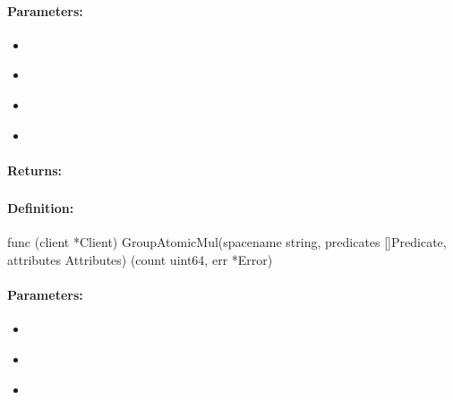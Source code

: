 \paragraph{Parameters:}
\begin{itemize}[noitemsep]
\item {}\\

\item {}\\

\item {}\\

\item {}\\

\end{itemize}

\paragraph{Returns:}


\pagebreak
\subsubsection{}
\label{api:Go:GroupAtomicMul}


\paragraph{Definition:}
\begin{gocode}
func (client *Client) GroupAtomicMul(spacename string, predicates []Predicate, attributes Attributes) (count uint64, err *Error)
\end{gocode}

\paragraph{Parameters:}
\begin{itemize}[noitemsep]
\item {}\\

\item {}\\

\item {}\\

\end{itemize}

